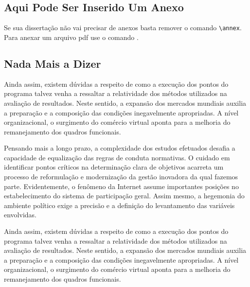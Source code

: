\documentclass[fleqn]{profmat-cefet}
\begin{document}
\annex

\begin{spacing}{1.5}
\chapter{Aqui Pode Ser Inserido Um Anexo}
\end{spacing}
\label{cap:um_anexo}

Se sua dissertação não vai precisar de anexos basta remover o comando 
\lstinline|\annex|.
Para anexar um arquivo pdf use o comando
\lstinline||.

\section{Nada Mais a Dizer}

Ainda assim, existem dúvidas a respeito de como a execução dos pontos do
programa talvez venha a ressaltar a relatividade dos métodos utilizados na
avaliação de resultados. Neste sentido, a expansão dos mercados mundiais auxilia
a preparação e a composição das condições inegavelmente apropriadas. A nível
organizacional, o surgimento do comércio virtual aponta para a melhoria do
remanejamento dos quadros funcionais. 

Pensando mais a longo prazo, a complexidade dos estudos efetuados desafia a
capacidade de equalização das regras de conduta normativas. O cuidado em
identificar pontos críticos na determinação clara de objetivos acarreta um
processo de reformulação e modernização da gestão inovadora da qual fazemos
parte. Evidentemente, o fenômeno da Internet assume importantes posições no
estabelecimento do sistema de participação geral. Assim mesmo, a hegemonia do
ambiente político exige a precisão e a definição do levantamento das variáveis
envolvidas. 

Ainda assim, existem dúvidas a respeito de como a execução dos pontos do
programa talvez venha a ressaltar a relatividade dos métodos utilizados na
avaliação de resultados. Neste sentido, a expansão dos mercados mundiais auxilia
a preparação e a composição das condições inegavelmente apropriadas. A nível
organizacional, o surgimento do comércio virtual aponta para a melhoria do
remanejamento dos quadros funcionais. 
\end{document}
